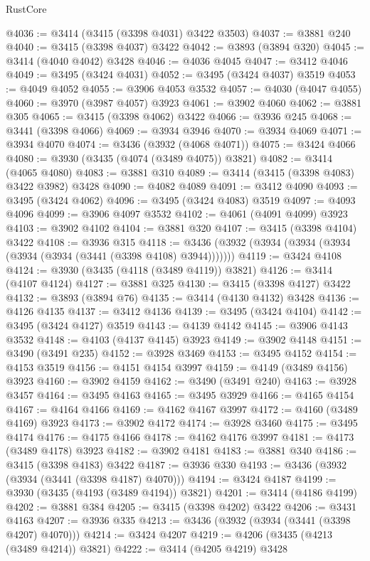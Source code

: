 \begin{lexlean}{RustCore}
\begin{coremodule}
@4036 := @3414 (@3415 (@3398 @4031) @3422 @3503)
@4037 := @3881 @240
@4040 := @3415 (@3398 @4037) @3422
@4042 := @3893 (@3894 @320)
@4045 := @3414 (@4040 @4042) @3428
@4046 := @4036 @4045
@4047 := @3412 @4046
@4049 := @3495 (@3424 @4031)
@4052 := @3495 (@3424 @4037) @3519
@4053 := @4049 @4052
@4055 := @3906 @4053 @3532
@4057 := @4030 (@4047 @4055)
@4060 := @3970 (@3987 @4057) @3923
@4061 := @3902 @4060
@4062 := @3881 @305
@4065 := @3415 (@3398 @4062) @3422
@4066 := @3936 @245
@4068 := @3441 (@3398 @4066)
@4069 := @3934 @3946
@4070 := @3934 @4069
@4071 := @3934 @4070
@4074 := @3436 (@3932 (@4068 @4071))
@4075 := @3424 @4066
@4080 := @3930 (@3435 (@4074 (@3489 @4075)) @3821)
@4082 := @3414 (@4065 @4080)
@4083 := @3881 @310
@4089 := @3414 (@3415 (@3398 @4083) @3422 @3982) @3428
@4090 := @4082 @4089
@4091 := @3412 @4090
@4093 := @3495 (@3424 @4062)
@4096 := @3495 (@3424 @4083) @3519
@4097 := @4093 @4096
@4099 := @3906 @4097 @3532
@4102 := @4061 (@4091 @4099) @3923
@4103 := @3902 @4102
@4104 := @3881 @320
@4107 := @3415 (@3398 @4104) @3422
@4108 := @3936 @315
@4118 := @3436 (@3932 (@3934 (@3934 (@3934 (@3934 (@3934 (@3441 (@3398 @4108) @3944)))))))
@4119 := @3424 @4108
@4124 := @3930 (@3435 (@4118 (@3489 @4119)) @3821)
@4126 := @3414 (@4107 @4124)
@4127 := @3881 @325
@4130 := @3415 (@3398 @4127) @3422
@4132 := @3893 (@3894 @76)
@4135 := @3414 (@4130 @4132) @3428
@4136 := @4126 @4135
@4137 := @3412 @4136
@4139 := @3495 (@3424 @4104)
@4142 := @3495 (@3424 @4127) @3519
@4143 := @4139 @4142
@4145 := @3906 @4143 @3532
@4148 := @4103 (@4137 @4145) @3923
@4149 := @3902 @4148
@4151 := @3490 (@3491 @235)
@4152 := @3928 @3469
@4153 := @3495 @4152
@4154 := @4153 @3519
@4156 := @4151 @4154 @3997
@4159 := @4149 (@3489 @4156) @3923
@4160 := @3902 @4159
@4162 := @3490 (@3491 @240)
@4163 := @3928 @3457
@4164 := @3495 @4163
@4165 := @3495 @3929
@4166 := @4165 @4154
@4167 := @4164 @4166
@4169 := @4162 @4167 @3997
@4172 := @4160 (@3489 @4169) @3923
@4173 := @3902 @4172
@4174 := @3928 @3460
@4175 := @3495 @4174
@4176 := @4175 @4166
@4178 := @4162 @4176 @3997
@4181 := @4173 (@3489 @4178) @3923
@4182 := @3902 @4181
@4183 := @3881 @340
@4186 := @3415 (@3398 @4183) @3422
@4187 := @3936 @330
@4193 := @3436 (@3932 (@3934 (@3441 (@3398 @4187) @4070)))
@4194 := @3424 @4187
@4199 := @3930 (@3435 (@4193 (@3489 @4194)) @3821)
@4201 := @3414 (@4186 @4199)
@4202 := @3881 @384
@4205 := @3415 (@3398 @4202) @3422
@4206 := @3431 @4163
@4207 := @3936 @335
@4213 := @3436 (@3932 (@3934 (@3441 (@3398 @4207) @4070)))
@4214 := @3424 @4207
@4219 := @4206 (@3435 (@4213 (@3489 @4214)) @3821)
@4222 := @3414 (@4205 @4219) @3428

\end{coremodule}
\end{lexlean}
